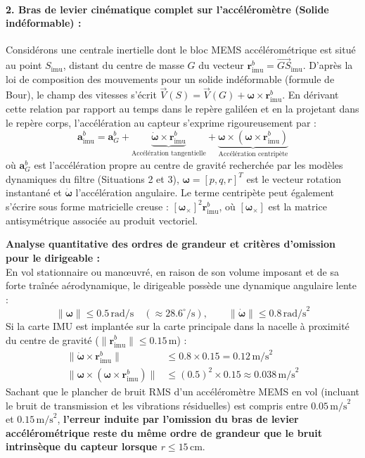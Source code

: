 \documentclass[../Formulations_Kalman.tex]{subfiles}
\begin{document}
\paragraph{2. Bras de levier cinématique complet sur l'accéléromètre (Solide indéformable) :}
Considérons une centrale inertielle dont le bloc MEMS accélérométrique est situé au point $S_{\text{imu}}$, distant du centre de masse $G$ du vecteur $\mathbf{r}_{\text{imu}}^b = \vec{GS}_{\text{imu}}$. D'après la loi de composition des mouvements pour un solide indéformable (formule de Bour), le champ des vitesses s'écrit $\vec{V}(S) = \vec{V}(G) + \boldsymbol{\omega} \times \mathbf{r}_{\text{imu}}^b$. En dérivant cette relation par rapport au temps dans le repère galiléen et en la projetant dans le repère corps, l'accélération au capteur s'exprime rigoureusement par :
\begin{equation}
\mathbf{a}_{\text{imu}}^b = \mathbf{a}_G^b + \underbrace{\dot{\boldsymbol{\omega}} \times \mathbf{r}_{\text{imu}}^b}_{\text{Accélération tangentielle}} + \underbrace{\boldsymbol{\omega} \times (\boldsymbol{\omega} \times \mathbf{r}_{\text{imu}}^b)}_{\text{Accélération centripète}}
\end{equation}
où $\mathbf{a}_G^b$ est l'accélération propre au centre de gravité recherchée par les modèles dynamiques du filtre (Situations 2 et 3), $\boldsymbol{\omega} = [p, q, r]^T$ est le vecteur rotation instantané et $\dot{\boldsymbol{\omega}}$ l'accélération angulaire.
Le terme centripète peut également s'écrire sous forme matricielle creuse : $[\boldsymbol{\omega}_\times]^2 \mathbf{r}_{\text{imu}}^b$, où $[\boldsymbol{\omega}_\times]$ est la matrice antisymétrique associée au produit vectoriel.

\textbf{Analyse quantitative des ordres de grandeur et critères d'omission pour le dirigeable :} \\
En vol stationnaire ou manœuvré, en raison de son volume imposant et de sa forte traînée aérodynamique, le dirigeable possède une dynamique angulaire lente :
\begin{equation}
\|\boldsymbol{\omega}\| \le 0.5\,\text{rad/s} \quad (\approx 28.6^\circ/\text{s}), \qquad \|\dot{\boldsymbol{\omega}}\| \le 0.8\,\text{rad/s}^2
\end{equation}
Si la carte IMU est implantée sur la carte principale dans la nacelle à proximité du centre de gravité ($\|\mathbf{r}_{\text{imu}}^b\| \le 0.15\,\text{m}$) :
\begin{align}
\|\dot{\boldsymbol{\omega}} \times \mathbf{r}_{\text{imu}}^b\| &\le 0.8 \times 0.15 = 0.12\,\text{m/s}^2 \\
\|\boldsymbol{\omega} \times (\boldsymbol{\omega} \times \mathbf{r}_{\text{imu}}^b)\| &\le (0.5)^2 \times 0.15 \approx 0.038\,\text{m/s}^2
\end{align}
Sachant que le plancher de bruit RMS d'un accéléromètre MEMS en vol (incluant le bruit de transmission et les vibrations résiduelles) est compris entre $0.05\,\text{m/s}^2$ et $0.15\,\text{m/s}^2$, \textbf{l'erreur induite par l'omission du bras de levier accélérométrique reste du même ordre de grandeur que le bruit intrinsèque du capteur lorsque $r \le 15\,\text{cm}$}.
\end{document}
